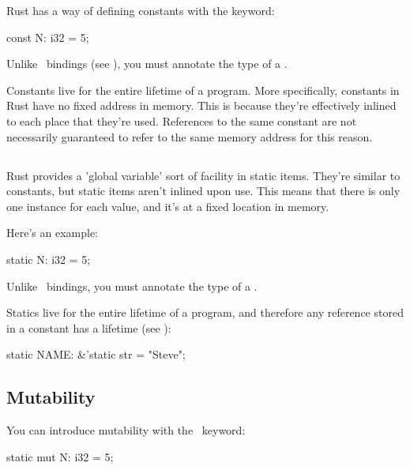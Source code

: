 Rust has a way of defining constants with the  keyword:

\begin{rustc}
const N: i32 = 5;
\end{rustc}

Unlike \keylet\ bindings (see ), you must annotate the type of a .

\blank

Constants live for the entire lifetime of a program. More specifically, constants in Rust have no fixed address in memory. This 
is because they're effectively inlined to each place that they're used. References to the same constant are not necessarily guaranteed 
to refer to the same memory address for this reason.

\subsection*{}
\label{paragraph:static}

Rust provides a 'global variable' sort of facility in static items. They're similar to constants, but static items aren't inlined upon 
use. This means that there is only one instance for each value, and it's at a fixed location in memory.

\blank

Here's an example:

\begin{rustc}
static N: i32 = 5;
\end{rustc}

Unlike \keylet\ bindings, you must annotate the type of a .

\blank

Statics live for the entire lifetime of a program, and therefore any reference stored in a constant has a  lifetime
(see ):

\begin{rustc}
static NAME: &'static str = "Steve";
\end{rustc}

\subsection*{Mutability}

You can introduce mutability with the \mut\ keyword:

\begin{rustc}
static mut N: i32 = 5;
\end{rustc}

